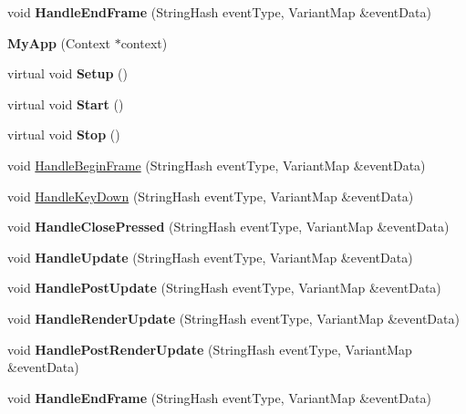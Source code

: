 \begin{DoxyCompactItemize}
void {\bfseries Handle\+End\+Frame} (String\+Hash event\+Type, Variant\+Map \&event\+Data)
\item 
\mbox{\label{class_my_app_ae0005664d756c2dce1da3a3a4f508c35}} 
{\bfseries My\+App} (Context $\ast$context)
\item 
\mbox{\label{class_my_app_a4f987b5f077f9653d13e09b9250b7b7c}} 
virtual void {\bfseries Setup} ()
\item 
\mbox{\label{class_my_app_ab1f4e292d574e3dcef51cfdf1ea2d21b}} 
virtual void {\bfseries Start} ()
\item 
\mbox{\label{class_my_app_ae6e1f4f1e83b1b8ea6bb9eb36c38cc50}} 
virtual void {\bfseries Stop} ()
\item 
void \mbox{\hyperlink{class_my_app_a009ad0629cfb490636e2cf876c1c99cd}{Handle\+Begin\+Frame}} (String\+Hash event\+Type, Variant\+Map \&event\+Data)
\item 
void \mbox{\hyperlink{class_my_app_aef5d37aa52f53ea9c218ce6b21328068}{Handle\+Key\+Down}} (String\+Hash event\+Type, Variant\+Map \&event\+Data)
\item 
\mbox{\label{class_my_app_a1c9c597a039a5c91da0c0b96fe64227c}} 
void {\bfseries Handle\+Close\+Pressed} (String\+Hash event\+Type, Variant\+Map \&event\+Data)
\item 
\mbox{\label{class_my_app_abf4073723da0b7225df1b29d3fc085b1}} 
void {\bfseries Handle\+Update} (String\+Hash event\+Type, Variant\+Map \&event\+Data)
\item 
\mbox{\label{class_my_app_a86d17db079cc64c3c2f4c7a93b4df8ba}} 
void {\bfseries Handle\+Post\+Update} (String\+Hash event\+Type, Variant\+Map \&event\+Data)
\item 
\mbox{\label{class_my_app_a42d3cb621cafcd3248f0b5a94e81809e}} 
void {\bfseries Handle\+Render\+Update} (String\+Hash event\+Type, Variant\+Map \&event\+Data)
\item 
\mbox{\label{class_my_app_a61d8d8a736e8fa4b0ad5301a70a7712b}} 
void {\bfseries Handle\+Post\+Render\+Update} (String\+Hash event\+Type, Variant\+Map \&event\+Data)
\item 
\mbox{\label{class_my_app_ac5ffdb3c13635c101af711e901ca106a}} 
void {\bfseries Handle\+End\+Frame} (String\+Hash event\+Type, Variant\+Map \&event\+Data)
\end{DoxyCompactItemize}
